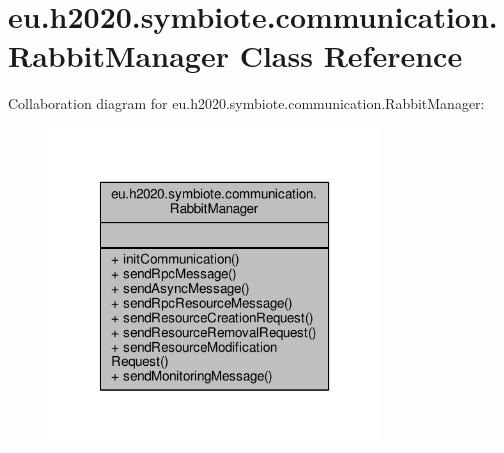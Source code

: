 \hypertarget{classeu_1_1h2020_1_1symbiote_1_1communication_1_1RabbitManager}{}\section{eu.\+h2020.\+symbiote.\+communication.\+Rabbit\+Manager Class Reference}
\label{classeu_1_1h2020_1_1symbiote_1_1communication_1_1RabbitManager}


Collaboration diagram for eu.\+h2020.\+symbiote.\+communication.\+Rabbit\+Manager\+:
\nopagebreak
\begin{figure}[H]
\begin{center}
\leavevmode
\includegraphics[width=250pt]{classeu_1_1h2020_1_1symbiote_1_1communication_1_1RabbitManager__coll__graph}
\end{center}
\end{figure}
